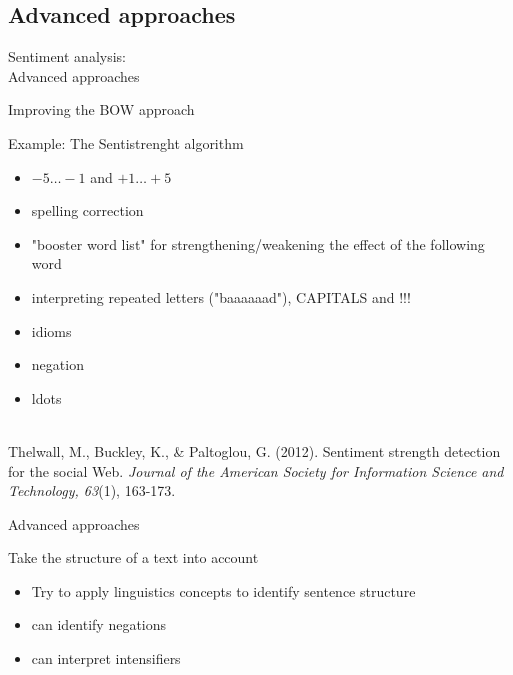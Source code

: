 \documentclass{beamer}
\begin{document}
\subsection{Advanced approaches}
\begin{frame}
	Sentiment analysis:\\
	Advanced approaches
\end{frame}


\begin{frame}{Improving the BOW approach}
	\begin{block}{Example: The Sentistrenght algorithm}
		\begin{itemize}
			\item $-5\ldots-1$ and $+1\ldots+5$
			\item spelling correction
			\item "booster word list" for strengthening/weakening the effect of the following word
			\item interpreting repeated letters ("baaaaaad"), CAPITALS and !!!
			\item idioms
			\item negation 
			\item ldots
		\end{itemize}
	\end{block}
	~ \\
	\tiny{Thelwall, M., Buckley, K., \& Paltoglou, G. (2012). Sentiment strength detection for the social Web. \emph{Journal of the American Society for Information Science and Technology, 63}(1), 163-173.\\}
\end{frame}


\begin{frame}{Advanced approaches}
	\begin{block}{Take the structure of a text into account}
		\begin{itemize}
			\item Try to apply linguistics concepts to identify sentence structure
			\item can identify negations
			\item can interpret intensifiers
		\end{itemize}
	\end{block}
\end{frame}
\end{document}
